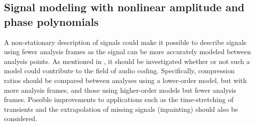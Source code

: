\subsection{Signal modeling with nonlinear amplitude and phase polynomials}

A non-stationary description of signals could make it possible to describe
signals using fewer analysis frames as the signal can be more accurately modeled
between analysis points. As mentioned in \cite{betser2009sinusoidal}, it should
be investigated whether or not such a model could contribute to the field of audio
coding. Specifically, compression ratios should be compared between analyses
using a lower-order model, but with more analysis frames, and those using higher-order
models but fewer analysis frames. Possible improvements to applications such as
the time-stretching of transients and the extrapolation of missing signals
(inpainting) should also be considered.
